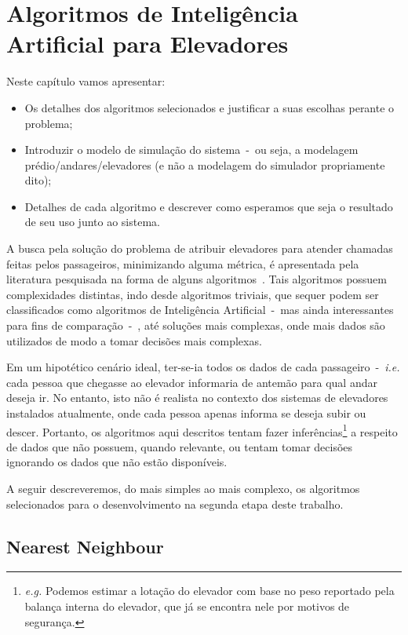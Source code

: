 \chapter{\label{chap:ai}Algoritmos de Inteligência Artificial para Elevadores}

Neste capítulo vamos apresentar:

\begin{itemize}
\item Os detalhes dos algoritmos selecionados e justificar a suas escolhas perante o problema;
\item Introduzir o modelo de simulação do sistema~-~ou seja, a modelagem
prédio/andares/elevadores (e não a modelagem do simulador propriamente dito);
\item Detalhes de cada algoritmo e descrever como esperamos que seja o resultado de seu uso junto ao sistema.
\end{itemize}

A busca pela solução do problema de atribuir elevadores para atender chamadas
feitas pelos passageiros, minimizando alguma métrica, é apresentada pela
literatura pesquisada na forma de alguns algoritmos~\cite{KOEHLEROTTIGER02}.
Tais algoritmos possuem complexidades distintas, indo desde algoritmos triviais,
que sequer podem ser classificados como algoritmos de Inteligência Artificial~-~mas ainda
interessantes para fins de comparação~-~, até soluções mais complexas, onde mais
dados são utilizados de modo a tomar decisões mais complexas.

Em um hipotético cenário ideal, ter-se-ia todos os dados de cada passageiro~-~\textit{i.e.} cada
pessoa que chegasse ao elevador informaria de antemão para qual andar deseja ir.
No entanto, isto não é realista no contexto dos sistemas de elevadores
instalados atualmente, onde cada pessoa apenas informa se deseja subir ou descer. Portanto, os algoritmos
aqui descritos tentam fazer inferências\footnote{\textit{e.g.} Podemos estimar a
lotação do elevador com base no peso reportado pela balança interna do elevador, que já se
  encontra nele por motivos de segurança.} a respeito de dados que não possuem,
quando relevante, ou tentam tomar decisões ignorando os dados que não estão disponíveis.

A seguir descreveremos, do mais simples ao mais complexo, os algoritmos
selecionados para o desenvolvimento na segunda etapa deste trabalho.

\section{\label{sec:ai:nn}Nearest Neighbour}

